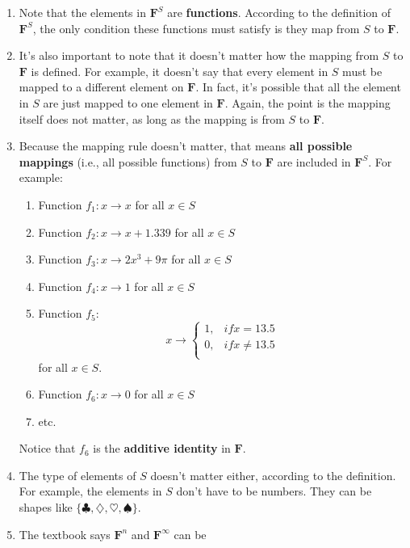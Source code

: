 \documentclass[12pt, letterpaper, oneside]{book}
\begin{document}
\begin{enumerate}
  \item Note that the elements in $\mathbf{F}^S$ are \textbf{functions}.
    According to the definition of $\mathbf{F}^S$, the only condition these
    functions must satisfy is they map from $S$ to $\mathbf{F}$.
  \item It's also important to note that it doesn't matter how the mapping from
    $S$ to $\mathbf{F}$ is defined. For example, it doesn't say that every
    element in $S$ must be mapped to a different element on $\mathbf{F}$. In
    fact, it's possible that all the element in $S$ are just mapped to one
    element in $\mathbf{F}$. Again, the point is the mapping itself does not
    matter, as long as the mapping is from $S$ to $\mathbf{F}$.
  \item \label{mapping rules} Because the mapping rule doesn't matter, that
    means \textbf{all possible mappings} (i.e., all possible functions) from
    $S$ to $\mathbf{F}$ are included in $\mathbf{F}^S$. For example:
    \begin{enumerate}
      \item Function $f_1: x \rightarrow x$ for all $x \in S$
      \item Function $f_2: x \rightarrow x + 1.339$ for all $x \in S$
      \item Function $f_3: x \rightarrow 2x^3 + 9\pi$ for all $x \in S$
      \item Function $f_4: x \rightarrow 1$ for all $x \in S$
      \item Function $f_5:$
        \[
          x \rightarrow \begin{cases}
            1, & if x = 13.5 \\
            0,  & if x \neq 13.5 \\
          \end{cases}
        \]
        for all $x \in S$.
      \item Function $f_6: x \rightarrow 0$ for all $x \in S$
      \item etc.
    \end{enumerate}
    Notice that $f_6$ is the \textbf{additive identity} in $\mathbf{F}$.
  \item The type of elements of $S$ doesn't matter either, according to the
    definition. For example, the elements in $S$ don't have to be numbers. They
    can be shapes like $\{ \clubsuit, \diamondsuit, \heartsuit, \spadesuit \}$.
  \item The textbook says $\mathbf{F}^n$ and $\mathbf{F}^{\infty}$ can be

\end{enumerate}
\end{document}
